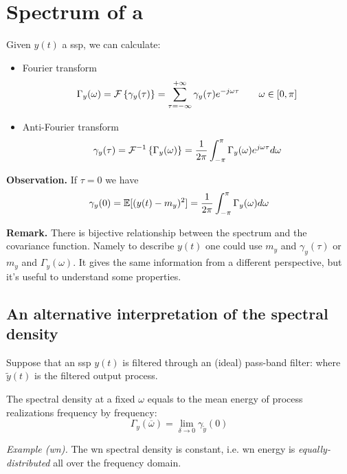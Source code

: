 \section{Spectrum of a }
Given $y(t)$ a \gls{ssp}, we can calculate:
\begin{itemize}
	\item Fourier transform
	\[
		\Gamma _{y}(\omega)=\mathcal{F}\left\{\gamma _{y}(\tau )\right\}=\sum_{\tau =-\infty }^{+\infty} \gamma _{y}(\tau ) e^{-j\omega \tau } \qquad \omega \in [0,\pi ]
	\]
	\item Anti-Fourier transform
	\[
		\gamma _{y}(\tau)=\mathcal{F}^{-1}\left\{\Gamma _{y}(\omega)\right\}=\frac{1}{2\pi }\int_{-\pi }^{\pi } \Gamma _{y}(\omega )e^{j\omega \tau }d\omega  
	\]
\end{itemize}

\textbf{Observation.}
If $\tau =0$ we have
\[
	\gamma _{y}(0)=\mathbb{E}[(y(t)-m_{y})^2 ]=\frac{1}{2\pi }\int_{-\pi }^{\pi } \Gamma _{y}(\omega )d\omega 
\]

\textbf{Remark.}
There is bijective relationship between the spectrum and the covariance function. Namely to describe $y(t)$ one could use $m_{y}$ and $\gamma _{y}(\tau )$ or $m_{y}$ and $\Gamma _{y}(\omega)$. It gives the same information from a different perspective, but it's useful to understand some properties.

\subsection{An alternative interpretation of the spectral density}
Suppose that an \gls{ssp} $y(t)$ is filtered through an (ideal) pass-band filter:
where $\tilde{y}(t)$ is the filtered output process.
\begin{theorem}
	The spectral density at a fixed $\omega$ equals to the mean energy of process realizations frequency by frequency:
	\[
		\Gamma _{y}(\overline{\omega})=\lim_{\delta  \to 0} \gamma _{\tilde{y}}(0)
	\]
\end{theorem}

\emph{Example (\gls{wn}).}
The \gls{wn} spectral density is constant, i.e. \gls{wn} energy is \emph{equally-distributed} all over the frequency domain.


